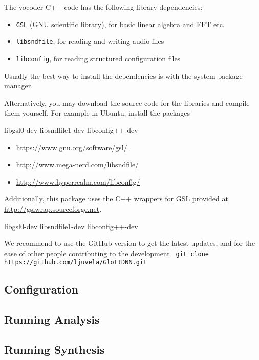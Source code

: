 \documentclass[a4paper, 11pt]{article}
\begin{document}
The vocoder C++ code has the following library dependencies:

\begin{itemize}
	\item \texttt{GSL} (GNU scientific library), for basic linear algebra and FFT etc.
	\item \texttt{libsndfile}, for reading and writing audio files
	\item \texttt{libconfig}, for reading structured configuration files
\end{itemize}
%
Usually the best way to install the dependencies is with the system package manager. 

Alternatively, you may download the source code for the libraries and compile them yourself. For example in Ubuntu, install the packages 

libgsl0-dev 
libsndfile1-dev
libconfig++-dev

\begin{itemize}
	\item[] \href{https://www.gnu.org/software/gsl/}{https://www.gnu.org/software/gsl/}
	\item[] \href{http://www.mega-nerd.com/libsndfile/}{http://www.mega-nerd.com/libsndfile/}
	\item[] \href{http://www.hyperrealm.com/libconfig/ }{http://www.hyperrealm.com/libconfig/}
\end{itemize}


Additionally, this package uses the C++ wrappers for GSL provided at 
\href{http://gslwrap.sourceforge.net}{http://gslwrap.sourceforge.net}.

libgsl0-dev 
libsndfile1-dev
libconfig++-dev

We recommend to use the GitHub version to get the latest updates, and for the ease of other people contributing to the development 
%
\texttt{
git clone https://github.com/ljuvela/GlottDNN.git 
}



\subsection{Configuration}

\subsection{Running Analysis}

\subsection{Running Synthesis}
\end{document}
